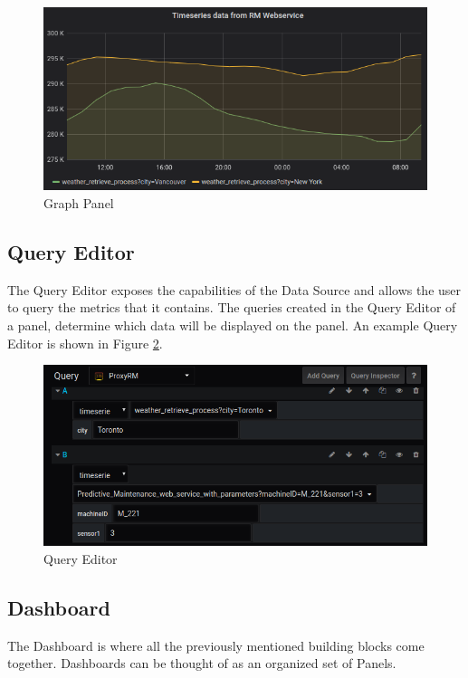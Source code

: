 \begin{figure}[h]
	\centering
	\includegraphics[width=130mm, keepaspectratio]{figures/graph-panel-medium.png}
	\caption{Graph Panel}
	\label{fig:graph-panel}
\end{figure}

\subsection{Query Editor}\label{query-editor}

The Query Editor exposes the capabilities of the Data Source and allows the user to query the metrics that it contains. The queries created in the Query Editor of a panel, determine which data will be displayed on the panel. \cite{grafana-queryeditor} An example Query Editor is shown in Figure \ref{fig:query-editor}.

\begin{figure}[H]
	\centering
	\includegraphics[width=130mm, keepaspectratio]{figures/query-editor.png}
	\caption{Query Editor}
	\label{fig:query-editor}
\end{figure}

\subsection{Dashboard}
The Dashboard is where all the previously mentioned building blocks come together. Dashboards can be thought of as an organized set of Panels. \cite{grafana-dashboard}

